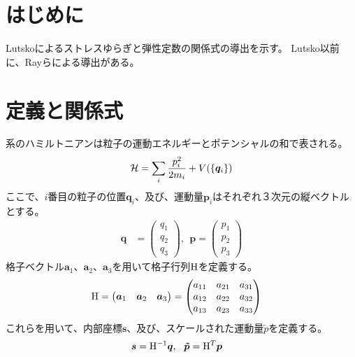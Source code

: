 \documentclass[11pt,a4paper,uplatex]{jsarticle}
\begin{document}
\section{はじめに}
Lutskoによるストレスゆらぎと弾性定数の関係式の導出を示す\cite{Lutsko1989}。
Lutsko以前に、Rayらによる導出がある\cite{Ray1984,Ray1981,Ray1982}。

\section{定義と関係式}
系のハミルトニアンは粒子の運動エネルギーとポテンシャルの和で表される。
\begin{align}
    {\cal H} = \sum_{i} \frac{p_{i}^{2}}{2m_{i}} + V(\{\bm{q}_{i}\})
\end{align}    
ここで、$i$番目の粒子の位置$\bm{q}_{i}$、及び、運動量$\bm{p}_{i}$はそれぞれ３次元の縦ベクトルとする。
\begin{align}
\bm{q} &= \begin{pmatrix} q_{1} \\ q_{2} \\ q_{3} \end{pmatrix}, \ \ 
\bm{p} = \begin{pmatrix} p_{1} \\ p_{2} \\ p_{3} \end{pmatrix} 
\end{align}
格子ベクトル$\bm{a}_{1}$、$\bm{a}_{2}$、$\bm{a}_{3}$を用いて格子行列${\rm H}$を定義する。
\begin{align}
{\rm H} &= \begin{pmatrix} \bm{a}_{1} & \bm{a}_{2} & \bm{a}_{3} \end{pmatrix} 
    = \begin{pmatrix} 
        a_{11} & a_{21} & a_{31} \\
        a_{12} & a_{22} & a_{32} \\
        a_{13} & a_{23} & a_{33} \\
    \end{pmatrix} 
\end{align}
これらを用いて、内部座標$\bm{s}$、及び、スケールされた運動量$\tilde{p}$を定義する。
\begin{align}
    \bm{s} &= {\rm H}^{-1} \bm{q}, \ \
    \bm{\tilde{p}} = {\rm H}^{T} \bm{p}
\end{align}
\end{document}
